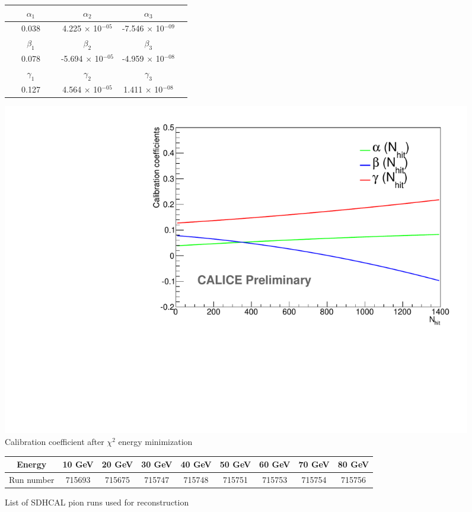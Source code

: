 \documentclass[cits]{JINST}
\begin{document}
\begin{center}
  \begin{figure}[!h]
    \begin{minipage}{0.48\textwidth}
      \begin{tabular}{| c | c | c | c |}
        \hline
        $\alpha_1$   &   $\alpha_2$    &   $\alpha_3$   \\ \hline
        ~~~0.038~~~    &   4.225 $\times$ 10$^{-05}$   &   -7.546 $\times$ 10$^{-09}$ \\ \hline \hline
        $\beta_1$    &   $\beta_2$     &   $\beta_3$   \\ \hline
        ~~~0.078~~~ &  -5.694 $\times$ 10$^{-05}$   &   -4.959 $\times$ 10$^{-08}$ \\ \hline \hline
        $\gamma_1$   &   $\gamma_2$    &   $\gamma_3$   \\ \hline
        ~~~0.127~~~  &   4.564 $\times$ 10$^{-05}$   &   1.411 $\times$ 10$^{-08}$  \\ \hline
      \end{tabular}    
    \end{minipage}  \hfill
    \begin{minipage}{0.5\textwidth}
        \includegraphics[width=\linewidth]{plots/EnergyCalibration.pdf}      
    \end{minipage}
    \caption{\label{SDHCAL_CALIBRATION} Calibration coefficient after $\chi^2$ energy minimization}
  \end{figure}
\end{center}


\begin{center}
  \begin{figure}[!h]
    \begin{tabular}{| c | c | c | c | c | c | c | c | c |}
      \hline
      Energy & 10 GeV & 20 GeV & 30 GeV & 40 GeV & 50 GeV & 60 GeV & 70 GeV & 80 GeV \\ \hline
      Run number & 715693 & 715675 & 715747 & 715748 & 715751 & 715753 & 715754 & 715756 \\ \hline
    \end{tabular}
    \caption{\label{SDHCAL_RUN_LIST} List of SDHCAL pion runs used for reconstruction}
  \end{figure}
\end{center}
\end{document}
